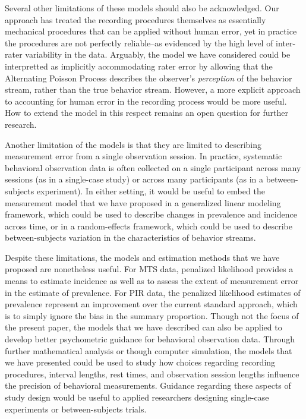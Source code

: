 \documentclass[man, noextraspace, floatsintext]{apa6}\usepackage[]{graphicx}\usepackage[]{color}
\begin{document}
Several other limitations of these models should also be acknowledged. Our approach has treated the recording procedures themselves as essentially mechanical procedures that can be applied without human error, yet in practice the procedures are not perfectly reliable--as evidenced by the high level of inter-rater variability in the \citet{Johnson2014} data. Arguably, the model we have considered could be interpretted as implicitly accommodating rater error by allowing that the Alternating Poisson Process describes the observer's \textit{perception} of the behavior stream, rather than the true behavior stream. However, a more explicit approach to accounting for human error in the recording process would be more useful. How to extend the model in this respect remains an open question for further research.

Another limitation of the models is that they are limited to describing measurement error from a single observation session. In practice, systematic behavioral observation data is often collected on a single participant across many sessions (as in a single-case study) or across many participants (as in a between-subjects experiment). In either setting, it would be useful to embed the measurement model that we have proposed in a generalized linear modeling framework, which could be used to describe changes in prevalence and incidence across time, or in a random-effects framework, which could be used to describe between-subjects variation in the characteristics of behavior streams.

Despite these limitations, the models and estimation methods that we have proposed are nonetheless useful. For MTS data, penalized likelihood provides a means to estimate incidence as well as to assess the extent of measurement error in the estimate of prevalence. For PIR data, the penalized likelihood estimates of prevalence represent an improvement over the current standard approach, which is to simply ignore the bias in the summary proportion. Though not the focus of the present paper, the models that we have described can also be applied to develop better psychometric guidance for behavioral observation data. Through further mathematical analysis or though computer simulation, the models that we have presented could be used to study how choices regarding recording procedures, interval lengths, rest times, and observation session lengths influence the precision of behavioral measurements. Guidance regarding these aspects of study design would be useful to applied researchers designing single-case experiments or between-subjects trials.
\end{document}
